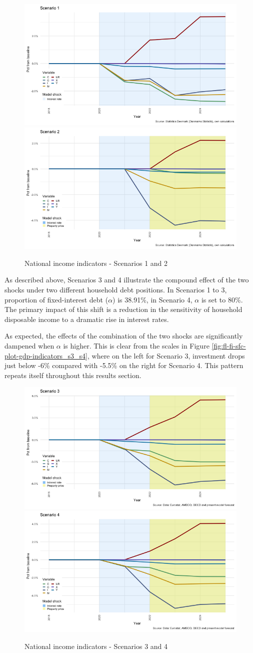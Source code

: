 \documentclass[
]{book}
\begin{document}
\begin{figure}[H]
\includegraphics[width=0.5\linewidth]{figures/fl-fi-sfc-plot-gdp-indicators-s1-s2-1} \includegraphics[width=0.5\linewidth]{figures/fl-fi-sfc-plot-gdp-indicators-s1-s2-2} \caption{National income indicators - Scenarios 1 and 2}\label{fig:fl-fi-sfc-plot-gdp-indicators-s1-s2}
\end{figure}

As described above, Scenarios 3 and 4 illustrate the compound effect of the two shocks under two different household debt positions. In Scenarios 1 to 3, proportion of fixed-interest debt (\(\alpha\)) is 38.91\%, in Scenario 4, \(\alpha\) is set to 80\%. The primary impact of this shift is a reduction in the sensitivity of household disposable income to a dramatic rise in interest rates.

As expected, the effects of the combination of the two shocks are significantly dampened when \(\alpha\) is higher. This is clear from the scales in Figure \ref{fig:fl-fi-sfc-plot-gdp-indicators_s3_s4}, where on the left for Scenario 3, investment drops just below -6\% compared with -5.5\% on the right for Scenario 4. This pattern repeats itself throughout this results section.

\begin{figure}[H]
\includegraphics[width=0.5\linewidth]{figures/fl-fi-sfc-plot-gdp-indicators-s3-s4-1} \includegraphics[width=0.5\linewidth]{figures/fl-fi-sfc-plot-gdp-indicators-s3-s4-2} \caption{National income indicators - Scenarios 3 and 4}\label{fig:fl-fi-sfc-plot-gdp-indicators-s3-s4}
\end{figure}
\end{document}
